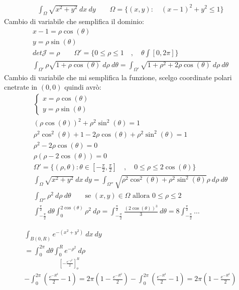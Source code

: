 \documentclass[a4paper, oneside]{article}
\begin{document}
\begin{example}
    \begin{gather*}
        \int_{\Omega} \sqrt{x^2 + y^2} \ dx \ dy \qquad \Omega = \{ (x,y): \quad (x-1)^2+y^2 \leq 1 \}
    \end{gather*}
    Cambio di variabile che semplifica il dominio:
    \begin{gather*}
        x-1 = \rho \cos(\theta)\\
        y = \rho \sin(\theta)\\
        det \mathcal{J} = \rho \qquad \Omega' = \{ 0 \leq \rho \leq 1 \quad , \quad \theta \int [0,2\pi] \}\\
        \int_{\Omega'} \rho \sqrt{1+\rho \cos(\theta)} \ d\rho \ d\theta = \int_{\Omega'} \sqrt{1+\rho^2 + 2\rho \cos(\theta)} \ d\rho \ d\theta
    \end{gather*}
    Cambio di variabile che mi semplifica la funzione, scelgo coordinate polari cnetrate in $(0,0)$ quindi avrò:
    \begin{gather*}
        \begin{cases}
            x = \rho \cos(\theta) \\
            y = \rho \sin(\theta) 
    \end{cases}\\
    (\rho \cos(\theta))^2 + \rho^2 \sin^2(\theta) = 1\\
    \rho^2 \cos^2(\theta) + 1 -2\rho \cos(\theta) + \rho^2 \sin^2(\theta) = 1\\
    \rho^2 - 2 \rho \cos(\theta) = 0\\
    \rho(\rho -2\cos(\theta)) = 0\\
    \Omega' = \{ (\rho, \theta): \theta \in [-\frac{\pi}{2}, \frac{\pi}{2}] \quad , \quad 0 \leq \rho \leq 2 \cos(\theta) \}\\
    \int_{\Omega} \sqrt{ x^2 + y^2} \ dx \ dy = \int_{\Omega''} \sqrt{\rho^2 \cos^2(\theta) + \rho^2 \sin^2(\theta)} \rho \ d\rho \ d\theta\\
    \int_{\Omega''} \rho^2 \ d\rho \ d\theta \qquad \text{se } (x,y) \in \Omega \text{ allora } 0 \leq \rho \leq 2\\
    \int_{-\frac{\pi}{2}}^{\frac{\pi}{2}} d\theta \int_{0}^{2 \cos(\theta)} \rho^2 \ d\rho = \int_{-\frac{\pi}{2}}^{\frac{\pi}{2}} \frac{(2\cos(\theta))^3}{3} \ d\theta = 8 \int_{-\frac{\pi}{2}}^{\frac{\pi}{2}} \dots
    \end{gather*}
    \end{example}
    \begin{example}
        \begin{gather*}
            \int_{B(0,R)} e^{-(x^2+y^2)} \ dx \ dy\\
            = \int_{0}^{2\pi} d\theta \underset{\left[-\frac{e^{-\rho^2}}{2}\right]_o^R }{\int_{0}^{R} e^{-\rho^2} \ d\rho}\\
            -\int_{0}^{2\pi} \left( \frac{e^{-R^2}}{2}-1 \right) = 2\pi ( 1-\frac{e^{-R^2}}{2})
            -\int_{0}^{2\pi} \left( \frac{e^{-R^2}}{2}-1 \right) = 2\pi ( 1-\frac{e^{-R^2}}{2})
        \end{gather*}
    \end{example}
\end{document}
